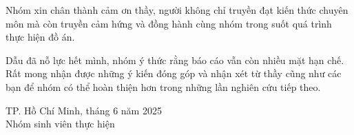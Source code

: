 \documentclass[12pt,a4paper]{report}
\begin{document}
Nhóm xin chân thành cảm ơn thầy, người không chỉ truyền đạt kiến thức chuyên môn mà còn truyền cảm hứng và đồng hành cùng nhóm trong suốt quá trình thực hiện đồ án.

Dẫu đã nỗ lực hết mình, nhóm ý thức rằng báo cáo vẫn còn nhiều mặt hạn chế. Rất mong nhận được những ý kiến đóng góp và nhận xét từ thầy cũng như các bạn để nhóm có thể hoàn thiện hơn trong những lần nghiên cứu tiếp theo.

\vspace{2em}

\begin{flushright}
TP. Hồ Chí Minh, tháng 6 năm 2025\\
Nhóm sinh viên thực hiện
\end{flushright}




\renewcommand{\contentsname}{}        %
\renewcommand{\listtablename}{}       %
\renewcommand{\listfigurename}{}      %

\chapter*{}
\tableofcontents

\newpage
\chapter*{}
\vspace*{-7em}
\listoftables

\newpage
\chapter*{}
\vspace*{-7em}
\listoffigures

\newpage
\chapter*{}
\end{document}
